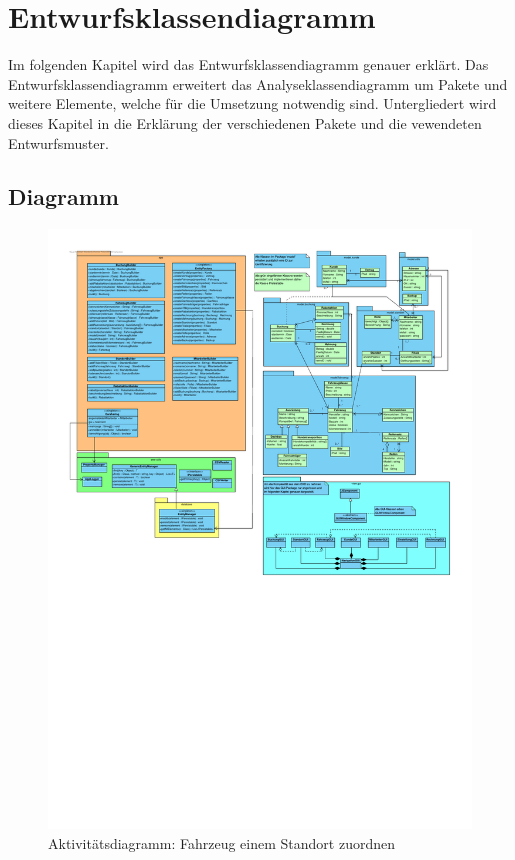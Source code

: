 \chapter{Entwurfsklassendiagramm}

Im folgenden Kapitel wird das Entwurfsklassendiagramm genauer erklärt. Das Entwurfsklassendiagramm erweitert das Analyseklassendiagramm um Pakete und weitere Elemente, welche für die Umsetzung notwendig sind. Untergliedert wird dieses Kapitel in die Erklärung der verschiedenen Pakete und die vewendeten Entwurfsmuster.

\section{Diagramm}

\begin{figure}[!ht]
    \centering
    \includegraphics[width=\textwidth, trim = 0cm 12cm 0cm 0cm]{Bilder/Diagramme/Entwurfsklassendiagramm.pdf}
    \caption{Aktivitätsdiagramm: Fahrzeug einem Standort zuordnen}
    \label{img:ekd}
\end{figure}

